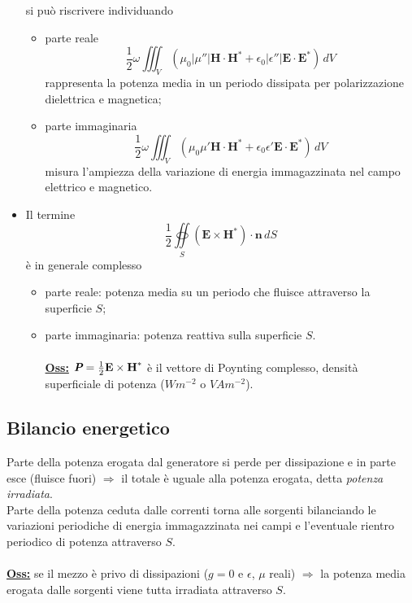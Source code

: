 \documentclass[a4paper]{article}
\let\oldoiint\oiint
\renewcommand{\oiint}{\oldoiint\limits}
\begin{document}
\begin{itemize}
si può riscrivere individuando
\begin{itemize}
\item parte reale
\begin{equation*}
\frac{1}{2}\omega\iiint_V(\mu_0|\mu''|\textbf{H}\cdot\textbf{H}^*+\epsilon_0|\epsilon''|\textbf{E}\cdot\textbf{E}^*)\,dV
\end{equation*}
rappresenta la potenza media in un periodo dissipata per polarizzazione dielettrica e magnetica;
\item parte immaginaria
\begin{equation*}
\frac{1}{2}\omega\iiint_V(\mu_0\mu'\textbf{H}\cdot\textbf{H}^*+\epsilon_0\epsilon'\textbf{E}\cdot\textbf{E}^*)\,dV
\end{equation*}
misura l'ampiezza della variazione di energia immagazzinata nel campo elettrico e magnetico.
\end{itemize}
\item Il termine
\begin{equation*}
\frac{1}{2}\oiint_S(\textbf{E}\times\textbf{H}^*)\cdot\textbf{n}\,dS
\end{equation*}
è in generale complesso
\begin{itemize}
\item parte reale: potenza media su un periodo che fluisce attraverso la superficie $S$;
\item parte immaginaria: potenza reattiva sulla superficie $S$.\\\\
\underline{\textbf{Oss:}} $\emph{\textbf{P}}=\frac{1}{2}\textbf{E}\times\textbf{H}^*$ è il vettore di Poynting complesso, densità superficiale di potenza ($Wm^{-2}$ o $VAm^{-2}$).
\end{itemize}
\end{itemize}
\subsection*{Bilancio energetico}
Parte della potenza erogata dal generatore si perde per dissipazione e in parte esce (fluisce fuori) $\Rightarrow$ il totale è uguale alla potenza erogata, detta \emph{potenza irradiata}.\\
Parte della potenza ceduta dalle correnti torna alle sorgenti bilanciando le variazioni periodiche di energia immagazzinata nei campi e l'eventuale rientro periodico di potenza attraverso $S$.\\\\
\underline{\textbf{Oss:}} se il mezzo è privo di dissipazioni ($g=0$ e $\epsilon$, $\mu$ reali) $\Rightarrow$ la potenza media erogata dalle sorgenti viene tutta irradiata attraverso $S$.
\end{document}

